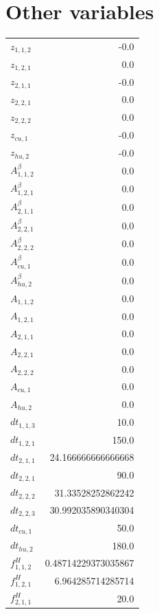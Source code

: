 \documentclass{article}%
\makeatletter
\let\mcnewpage=\newpage%
\newcommand{\TrickSupertabularIntoMulticols}{%
\renewcommand\newpage{%
\if@firstcolumn%
\hrule width\linewidth height0pt%
\columnbreak%
\else%
\mcnewpage%
\fi%
}%
}%
\makeatother
\begin{document}
\section{Other variables}%
\thispagestyle{plain}%
\begin{multicols*}{3}%
\TrickSupertabularIntoMulticols%
%
\begin{supertabular}{lr}%
	$z_{1,1,2}$ & -0.0 \\%
	$z_{1,2,1}$ & 0.0 \\%
	$z_{2,1,1}$ & -0.0 \\%
	$z_{2,2,1}$ & 0.0 \\%
	$z_{2,2,2}$ & 0.0 \\%
	$z_{cu,1}$ & -0.0 \\%
	$z_{hu,2}$ & -0.0 \\%
	$A_{1,1,2}^{\beta}$ & 0.0 \\%
	$A_{1,2,1}^{\beta}$ & 0.0 \\%
	$A_{2,1,1}^{\beta}$ & 0.0 \\%
	$A_{2,2,1}^{\beta}$ & 0.0 \\%
	$A_{2,2,2}^{\beta}$ & 0.0 \\%
	$A_{cu,1}^{\beta}$ & 0.0 \\%
	$A_{hu,2}^{\beta}$ & 0.0 \\%
	$A_{1,1,2}$ & 0.0 \\%
	$A_{1,2,1}$ & 0.0 \\%
	$A_{2,1,1}$ & 0.0 \\%
	$A_{2,2,1}$ & 0.0 \\%
	$A_{2,2,2}$ & 0.0 \\%
	$A_{cu,1}$ & 0.0 \\%
	$A_{hu,2}$ & 0.0 \\%
	$dt_{1,1,3}$ & 10.0 \\%
	$dt_{1,2,1}$ & 150.0 \\%
	$dt_{2,1,1}$ & 24.166666666666668 \\%
	$dt_{2,2,1}$ & 90.0 \\%
	$dt_{2,2,2}$ & 31.33528252862242 \\%
	$dt_{2,2,3}$ & 30.992035890340304 \\%
	$dt_{cu,1}$ & 50.0 \\%
	$dt_{hu,2}$ & 180.0 \\%
	$f_{1,1,2}^{H}$ & 0.48714229373035867 \\%
	$f_{1,2,1}^{H}$ & 6.964285714285714 \\%
	$f_{2,1,1}^{H}$ & 20.0 \\%

\end{supertabular}
\end{multicols*}
\end{document}
